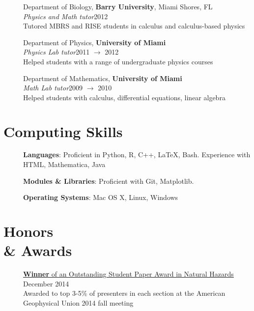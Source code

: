 \documentclass[margin,line]{resume}
\begin{document}
\begin{resume}
\begin{description}
    \item[] \normalsize Department of Biology, \textbf{Barry University}, Miami Shores, FL \\
    \emph{Physics and Math tutor}\hfill 2012 \\
    Tutored MBRS and RISE students in calculus and calculus-based physics

    \item[] \normalsize Department of Physics, \textbf{University of Miami} \\
    \emph{Physics Lab tutor}\hfill 2011 $\rightarrow$ 2012 \\
    Helped students with a range of undergraduate physics courses

    \item[] \normalsize Department of Mathematics, \textbf{University of Miami} \\
    \emph{Math Lab tutor}\hfill 2009 $\rightarrow$ 2010 \\
    Helped students with calculus, differential equations, linear algebra

\end{description}




\section{\mysidestyle \textbf{Computing Skills}}
\begin{description}
    \item[] \textbf{Languages}: Proficient in  Python, \textsf{R}, C++, \LaTeX, Bash. Experience with HTML, Mathematica, Java 
    \item[] \textbf{Modules \& Libraries}: Proficient with Git, Matplotlib. 
    \item[] \textbf{Operating Systems}: Mac OS X, Linux, Windows 

\end{description}   



\section{\mysidestyle \textbf{Honors} \\ \textbf{\&} \textbf{Awards}}\vspace{1mm}
\begin{description}   
    \item[] \normalsize \href{http://ospa.agu.org/ospa/2014-fall-meeting-ospa-winners/}{\textbf{Winner} of an Outstanding Student Paper Award in Natural Hazards} \hfill December 2014 \\
    \small Awarded to top 3-5\% of presenters in each section at the American Geophysical Union 2014 fall meeting


\end{description}
\end{resume}
\end{document}
